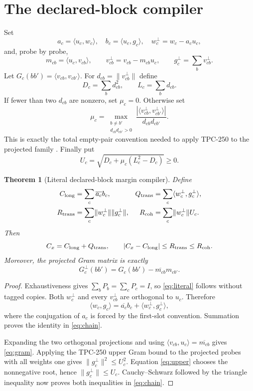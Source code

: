 \documentclass[10pt]{article}
\newtheorem{theorem}{Theorem}
\newcommand{\ip}[2]{\langle #1,#2\rangle}
\newcommand{\norm}[1]{\lVert #1\rVert}
\newcommand{\conj}[1]{\overline{#1}}
\begin{document}
\section{The declared-block compiler}

Set
\[
 a_c=\ip{u_c}{w_c},\quad b_c=\ip{u_c}{g_c},\quad
 w_c^\perp=w_c-a_cu_c,
\]
and, probe by probe,
\[
 m_{cb}=\ip{u_c}{v_{cb}},\qquad
 v_{cb}^\perp=v_{cb}-m_{cb}u_c,\qquad
 g_c^\perp=\sum_bv_{cb}^\perp.
\]
Let $G_c(bb')=\ip{v_{cb}}{v_{cb'}}$.  For
$d_{cb}=\norm{v_{cb}^\perp}$ define
\[
 D_c=\sum_bd_{cb}^2,\qquad L_c=\sum_bd_{cb}.
\]
If fewer than two $d_{cb}$ are nonzero, set $\mu_c=0$.  Otherwise set
\[
 \mu_c=\max_{\substack{b\ne b'\\d_{cb}d_{cb'}>0}}
 \frac{|\ip{v_{cb}^\perp}{v_{cb'}^\perp}|}{d_{cb}d_{cb'}}.
\]
This is exactly the total empty-pair convention needed to apply TPC-250 to
the projected family \cite{tpc250}.  Finally put
\begin{equation}\label{eq:upper}
 U_c=\sqrt{D_c+\mu_c(L_c^2-D_c)}\ge0.
\end{equation}

\begin{theorem}[Literal declared-block margin compiler]\label{thm:compiler}
Define
\begin{align*}
 C_{\rm long}&=\sum_c\conj{a_c}b_c,&
 Q_{\rm trans}&=\sum_c\ip{w_c^\perp}{g_c^\perp},\\
 R_{\rm trans}&=\sum_c\norm{w_c^\perp}\norm{g_c^\perp},&
 R_{\rm coh}&=\sum_c\norm{w_c^\perp}U_c.
\end{align*}
Then
\begin{equation}\label{eq:chain}
 C_x=C_{\rm long}+Q_{\rm trans},\qquad
 |C_x-C_{\rm long}|\le R_{\rm trans}\le R_{\rm coh}.
\end{equation}
Moreover, the projected Gram matrix is exactly
\begin{equation}\label{eq:gram}
 G_c^\perp(bb')=G_c(bb')-\conj{m_{cb}}m_{cb'}.
\end{equation}
\end{theorem}

\begin{proof}
Exhaustiveness gives $\sum_bP_b=\sum_cP_c=I$, so
\eqref{eq:literal} follows without tagged copies.  Both $w_c^\perp$ and every
$v_{cb}^\perp$ are orthogonal to $u_c$.  Therefore
\[
 \ip{w_c}{g_c}=\conj{a_c}b_c+\ip{w_c^\perp}{g_c^\perp},
\]
where the conjugation of $a_c$ is forced by the first-slot convention.
Summation proves the identity in \eqref{eq:chain}.

Expanding the two orthogonal projections and using
$\ip{v_{cb}}{u_c}=\conj{m_{cb}}$ gives \eqref{eq:gram}.  Applying the TPC-250
upper Gram bound to the projected probes with all weights one gives
$\norm{g_c^\perp}^2\le U_c^2$.  Equation \eqref{eq:upper} chooses the
nonnegative root, hence $\norm{g_c^\perp}\le U_c$.  Cauchy--Schwarz followed
by the triangle inequality now proves both inequalities in
\eqref{eq:chain}.
\end{proof}
\end{document}
